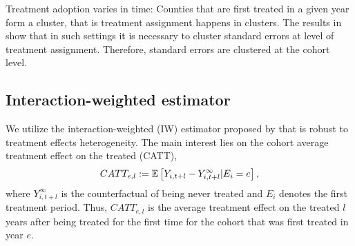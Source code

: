 Treatment adoption varies in time: Counties that are first treated in a given year form a cluster, that is treatment assignment happens in clusters. The results in \cite{Abadie_2017} show that in such settings it is necessary to cluster standard errors at level of treatment assignment. Therefore, standard errors are clustered at the cohort level.



\subsection{Interaction-weighted estimator}

We utilize the interaction-weighted (IW) estimator proposed by \cite{Sun_2021} that is robust to treatment effects heterogeneity. The main interest lies on the cohort average treatment effect on the treated (CATT),
\begin{align*}
	CATT_{e, l} := \mathbb{E} \left[ Y_{i, t+l} - Y_{i, t+l}^{\infty} | E_i = e \right],
\end{align*}
where $Y_{i, t+l}^{\infty}$ is the counterfactual of being never treated and $E_i$ denotes the first treatment period. Thus, $CATT_{e, l}$ is the average treatment effect on the treated $l$ years after being treated for the first time for the cohort that was first treated in year $e$.

